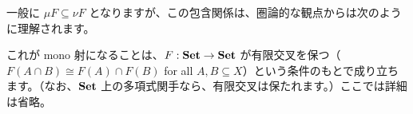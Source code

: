 \documentclass[
		head_space=20mm,
		foot_space=20mm,
		gutter=10mm,
		line_length=190mm
]{jlreq}
\begin{document}
\noindent {} 一般に $\mu F\subseteq \nu F$ となりますが、この包含関係は、圏論的な観点からは次のように理解されます。\vspace{5pt}
\begin{center}
\end{center}\vspace{5pt} 
これが mono 射になることは、$F:\mathbf{Set}\to\mathbf{Set}$ が有限交叉を保つ（$F(A\cap B)\cong F(A)\cap F(B)$ for all $A,B\subseteq X$）という条件のもとで成り立ちます。（なお、$\mathbf{Set}$ 上の多項式関手なら、有限交叉は保たれます。）ここでは詳細は省略。
\vspace{12pt}
\end{document}
